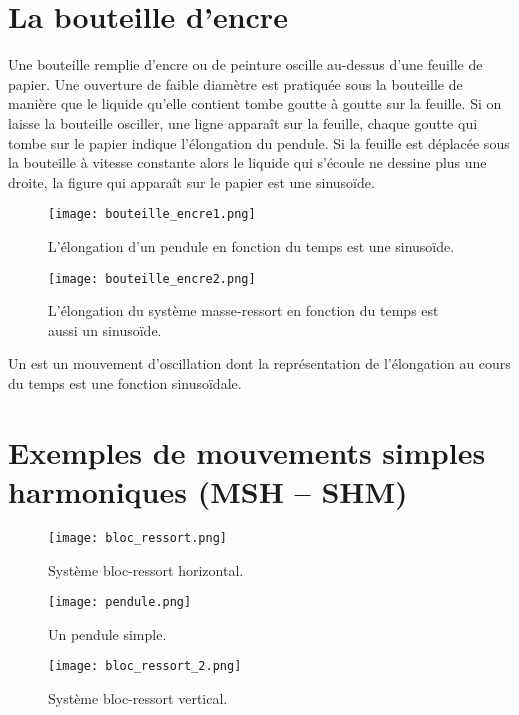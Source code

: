 \newpage

\section{La bouteille d'encre}
Une bouteille remplie d'encre ou de peinture oscille au-dessus d'une feuille de papier. Une ouverture de faible diamètre est pratiquée sous la bouteille de manière que le liquide qu'elle contient tombe goutte à goutte sur la feuille. Si on laisse la bouteille osciller, une ligne apparaît sur la feuille, chaque goutte qui tombe sur le papier indique l'élongation du pendule.
Si la feuille est déplacée sous la bouteille à vitesse constante alors le liquide qui s'écoule ne dessine plus une droite, la figure qui apparaît sur le papier est une sinusoïde.

\begin{figure}[h!]
    \begin{minipage}{.5\textwidth}
        \centering
        \texttt{[image: bouteille\_encre1.png]}
        \caption{L'élongation d'un pendule en fonction du temps est une sinusoïde.}
        \label{bouteille_encre1}
    \end{minipage}
    \begin{minipage}{.5\textwidth}
        \centering
        \texttt{[image: bouteille\_encre2.png]}
        \caption{L'élongation du système masse-ressort en fonction du temps est aussi un sinusoïde.}
        \label{bouteille_encre2}
    \end{minipage}
\end{figure}

\begin{encadre}
    Un  est un mouvement d'oscillation dont la représentation de l'élongation au cours du temps est une fonction sinusoïdale.
\end{encadre}

\newpage

\section{Exemples de mouvements simples harmoniques (MSH – SHM)}
\begin{figure}[h!]
    \centering
    \texttt{[image: bloc\_ressort.png]}
    \caption{Système bloc-ressort horizontal.}
    \label{bloc_ressort}
\end{figure}

\begin{figure}[h!]
    \begin{minipage}{.5\textwidth}
        \centering
        \texttt{[image: pendule.png]}
        \caption{Un pendule simple.}
        \label{pendule}
    \end{minipage}
    \begin{minipage}{.5\textwidth}
        \centering
        \texttt{[image: bloc\_ressort\_2.png]}
        \caption{Système bloc-ressort vertical.}
        \label{bouteille_encre2}
    \end{minipage}
\end{figure}

